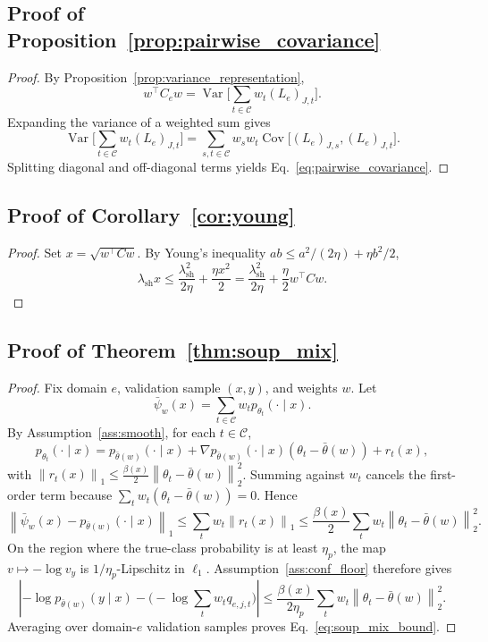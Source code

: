 \documentclass{article}
\theoremstyle{definition}
\newcommand{\cC}{\mathcal{C}}
\newcommand{\norm}[1]{\left\lVert #1 \right\rVert}
\newcommand{\abs}[1]{\left\lvert #1 \right\rvert}
\newcommand{\thetaw}{\bar{\theta}(w)}
\begin{document}
\subsection{Proof of Proposition~\ref{prop:pairwise_covariance}}

\begin{proof}
By Proposition~\ref{prop:variance_representation},
\[
w^\top C_e w
=
\operatorname{Var}\!\Big[\sum_{t\in\cC} w_t (L_e)_{J,t}\Big].
\]
Expanding the variance of a weighted sum gives
\[
\operatorname{Var}\!\Big[\sum_{t\in\cC} w_t (L_e)_{J,t}\Big]
=
\sum_{s,t\in\cC} w_s w_t \operatorname{Cov}\!\big[(L_e)_{J,s},(L_e)_{J,t}\big].
\]
Splitting diagonal and off-diagonal terms yields Eq.~\eqref{eq:pairwise_covariance}.
\end{proof}

\subsection{Proof of Corollary~\ref{cor:young}}

\begin{proof}
Set \(x=\sqrt{w^\top Cw}\). By Young's inequality \(ab\le a^2/(2\eta)+\eta b^2/2\),
\[
\lambda_{\mathrm{sh}}x
\le
\frac{\lambda_{\mathrm{sh}}^2}{2\eta}
+
\frac{\eta x^2}{2}
=
\frac{\lambda_{\mathrm{sh}}^2}{2\eta}
+
\frac{\eta}{2}w^\top Cw.
\]
\end{proof}

\subsection{Proof of Theorem~\ref{thm:soup_mix}}

\begin{proof}
Fix domain \(e\), validation sample \((x,y)\), and weights \(w\). Let
\[
\bar\psi_w(x)=\sum_{t\in\cC} w_t p_{\theta_t}(\cdot\mid x).
\]
By Assumption~\ref{ass:smooth}, for each \(t\in\cC\),
\[
p_{\theta_t}(\cdot\mid x)
=
p_{\thetaw}(\cdot\mid x)
+
\nabla p_{\thetaw}(\cdot\mid x)(\theta_t-\thetaw)
+
r_t(x),
\]
with \(\norm{r_t(x)}_1 \le \frac{\beta(x)}{2}\norm{\theta_t-\thetaw}_2^2\). Summing against \(w_t\) cancels the first-order term because \(\sum_t w_t(\theta_t-\thetaw)=0\). Hence
\[
\norm{\bar\psi_w(x)-p_{\thetaw}(\cdot\mid x)}_1
\le
\sum_t w_t \norm{r_t(x)}_1
\le
\frac{\beta(x)}{2}\sum_t w_t \norm{\theta_t-\thetaw}_2^2.
\]
On the region where the true-class probability is at least \(\eta_p\), the map \(v\mapsto -\log v_y\) is \(1/\eta_p\)-Lipschitz in \(\ell_1\). Assumption~\ref{ass:conf_floor} therefore gives
\[
\abs{
-\log p_{\thetaw}(y\mid x)
-
\Big(-\log \sum_t w_t q_{e,j,t}\Big)
}
\le
\frac{\beta(x)}{2\eta_p}\sum_t w_t \norm{\theta_t-\thetaw}_2^2.
\]
Averaging over domain-\(e\) validation samples proves Eq.~\eqref{eq:soup_mix_bound}.
\end{proof}
\end{document}
